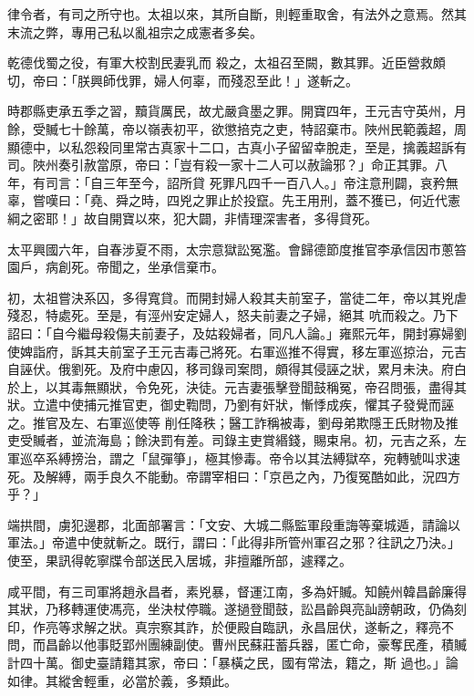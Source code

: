 
\begin{pinyinscope}

 律令者，有司之所守也。太祖以來，其所自斷，則輕重取舍，有法外之意焉。然其末流之弊，專用己私以亂祖宗之成憲者多矣。



 乾德伐蜀之役，有軍大校割民妻乳而
 殺之，太祖召至闕，數其罪。近臣營救頗切，帝曰：「朕興師伐罪，婦人何辜，而殘忍至此！」遂斬之。



 時郡縣吏承五季之習，黷貨厲民，故尤嚴貪墨之罪。開寶四年，王元吉守英州，月餘，受贓七十餘萬，帝以嶺表初平，欲懲掊克之吏，特詔棄市。陜州民範義超，周顯德中，以私怨殺同里常古真家十二口，古真小子留留幸脫走，至是，擒義超訴有司。陜州奏引赦當原，帝曰：「豈有殺一家十二人可以赦論邪？」命正其罪。八年，有司言：「自三年至今，詔所貸
 死罪凡四千一百八人。」帝注意刑闢，哀矜無辜，嘗嘆曰：「堯、舜之時，四兇之罪止於投竄。先王用刑，蓋不獲已，何近代憲綱之密耶！」故自開寶以來，犯大闢，非情理深害者，多得貸死。



 太平興國六年，自春涉夏不雨，太宗意獄訟冤濫。會歸德節度推官李承信因市蔥笞園戶，病創死。帝聞之，坐承信棄市。



 初，太祖嘗決系囚，多得寬貸。而開封婦人殺其夫前室子，當徒二年，帝以其兇虐殘忍，特處死。至是，有涇州安定婦人，怒夫前妻之子婦，絕其
 吭而殺之。乃下詔曰：「自今繼母殺傷夫前妻子，及姑殺婦者，同凡人論。」雍熙元年，開封寡婦劉使婢詣府，訴其夫前室子王元吉毒己將死。右軍巡推不得實，移左軍巡掠治，元吉自誣伏。俄劉死。及府中慮囚，移司錄司案問，頗得其侵誣之狀，累月未決。府白於上，以其毒無顯狀，令免死，決徒。元吉妻張擊登聞鼓稱冤，帝召問張，盡得其狀。立遣中使捕元推官吏，御史鞫問，乃劉有奸狀，慚悸成疾，懼其子發覺而誣之。推官及左、右軍巡使等
 削任降秩；醫工詐稱被毒，劉母弟欺隱王氏財物及推吏受贓者，並流海島；餘決罰有差。司錄主吏賞緡錢，賜束帛。初，元吉之系，左軍巡卒系縛搒治，謂之「鼠彈箏」，極其慘毒。帝令以其法縛獄卒，宛轉號叫求速死。及解縛，兩手良久不能動。帝謂宰相曰：「京邑之內，乃復冤酷如此，況四方乎？」



 端拱間，虜犯邊郡，北面部署言：「文安、大城二縣監軍段重誨等棄城遁，請論以軍法。」帝遣中使就斬之。既行，謂曰：「此得非所管州軍召之邪？往訊之乃決。」
 使至，果訊得乾寧牒令部送民入居城，非擅離所部，遽釋之。



 咸平間，有三司軍將趙永昌者，素兇暴，督運江南，多為奸贓。知饒州韓昌齡廉得其狀，乃移轉運使馮亮，坐決杖停職。遂撾登聞鼓，訟昌齡與亮訕謗朝政，仍偽刻印，作亮等求解之狀。真宗察其詐，於便殿自臨訊，永昌屈伏，遂斬之，釋亮不問，而昌齡以他事貶郢州團練副使。曹州民蘇莊蓄兵器，匿亡命，豪奪民產，積贓計四十萬。御史臺請籍其家，帝曰：「暴橫之民，國有常法，籍之，斯
 過也。」論如律。其縱舍輕重，必當於義，多類此。




\end{pinyinscope}
